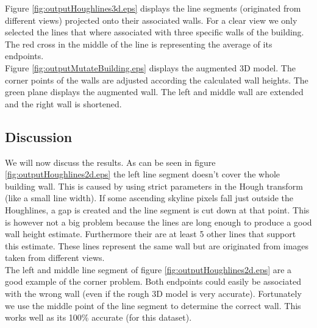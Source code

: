 \documentclass[10pt]{article}
\begin{document}
Figure \ref{fig:outputHoughlines3d.eps} displays the line segments (originated from
different views) projected onto their associated walls.  For a clear view we
only selected the lines that where associated with three specific walls of the building.  
The red cross in the middle of the line is representing the average of its endpoints.\\

Figure \ref{fig:outputMutateBuilding.eps} displays the augmented 3D model. The
corner points of the walls are adjusted according the calculated wall heights.
The green plane displays the augmented wall. The left and middle wall are extended
and the right wall is shortened.\\


\subsection{Discussion}
We will now discuss the results. As can be seen in figure \ref{fig:outputHoughlines2d.eps} the left line segment doesn't cover the whole building wall. This is caused by using strict parameters in the Hough transform (like a small line width).
If some ascending skyline pixels fall just outside the Houghlines, a gap is created and the line segment is cut down at that point. This is however not a big problem because the lines are long enough to produce a good wall height estimate. Furthermore their are at least 5 other lines that support this estimate. These lines represent the same wall but are originated from images taken from different views. \\
The left and middle line segment of figure \ref{fig:outputHoughlines2d.eps} are a good example of the corner problem. Both endpoints could easily be associated with the wrong wall (even if the rough 3D model is very accurate). Fortunately we use the middle point of the line segment to determine the correct wall. This works well as its 100\% accurate (for this dataset).


\end{document}
